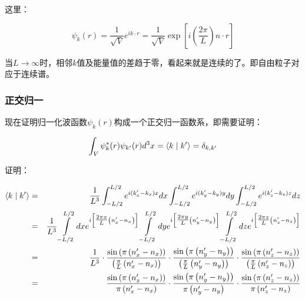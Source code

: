 这里：

\begin{equation}
\psi _k (r) = \frac{1}{{\sqrt V }}e^{ik \cdot r}  = \frac{1}{{\sqrt V }}\exp \left[ {i\left( {\frac{{2\pi }}{L}} \right)n \cdot r} \right]
\end{equation}

当$L \to \infty $时，相邻$k$值及能量值的差趋于零，看起来就是连续的了。即自由粒子对应于连续谱。


\subsubsection{正交归一}


现在证明归一化波函数$\psi _k (r)$构成一个正交归一函数系，即需要证明：

\begin{equation}
\int_V {\psi _k ^* (r)\psi _{k'} (r)d^3 x}  = \left\langle {k}
 \mathrel{\left | {\vphantom {k {k'}}}
 \right. \kern-\nulldelimiterspace}
 {{k'}} \right\rangle  = \delta _{k,k'} 
\end{equation}

证明：

\begin{eqnarray*}
\left\langle {k}
 \mathrel{\left | {\vphantom {k {k'}}}
 \right. \kern-\nulldelimiterspace}
 {{k'}} \right\rangle &  = &  \frac{1}{{L^3 }}\int_{ - L/2}^{L/2} {e^{i(k'_x  - k_x )x} dx} \int_{ - L/2}^{L/2} {e^{i(k'_y  - k_y )y} dy} \int_{ - L/2}^{L/2} {e^{i(k'_z  - k_z )z} dz}  \\
{} & = & \frac{1}{{L^3 }}\int\limits_{ - L/2}^{L/2} {dxe^{i\left[ {{\textstyle{{2\pi x} \over L}}\left( {n'_x  - n_x } \right)} \right]} } \int\limits_{ - L/2}^{L/2} {dye^{i\left[ {{\textstyle{{2\pi y} \over L}}\left( {n'_y  - n_y } \right)} \right]} \int\limits_{ - L/2}^{L/2} {dze^{i\left[ {{\textstyle{{2\pi z} \over L}}\left( {n'_z  - n_z } \right)} \right]} } } \\
{} & = & \frac{1}{{L^3 }} \cdot \frac{{\sin \left( {\pi \left( {n'_x  - n_x } \right)} \right)}}{{\left( {\frac{\pi }{L}\left( {n'_x  - n_x } \right)} \right)}} \cdot \frac{{\sin \left( {\pi \left( {n'_y  - n_y } \right)} \right)}}{{\left( {\frac{\pi }{L}\left( {n'_y  - n_y } \right)} \right)}} \cdot \frac{{\sin \left( {\pi \left( {n'_z  - n_z } \right)} \right)}}{{\left( {\frac{\pi }{L}\left( {n'_z  - n_z } \right)} \right)}} \\
{} & = & \frac{{\sin \left( {\pi \left( {n'_x  - n_x } \right)} \right)}}{{\pi \left( {n'_x  - n_x } \right)}} \cdot \frac{{\sin \left( {\pi \left( {n'_y  - n_y } \right)} \right)}}{{\pi \left( {n'_y  - n_y } \right)}} \cdot \frac{{\sin \left( {\pi \left( {n'_z  - n_z } \right)} \right)}}{{\pi \left( {n'_z  - n_z } \right)}}
\end{eqnarray*}

